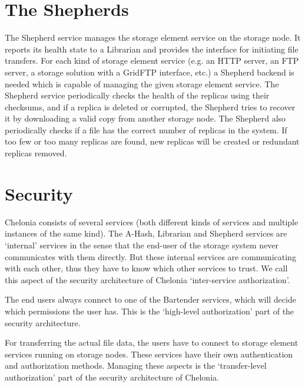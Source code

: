 \documentclass{book}
\begin{document}

\section{The Shepherds} %
\label{sec:the_shepherds}

The Shepherd service manages the storage element service on the storage node. It reports its health state to a Librarian and provides the interface for initiating file transfers. For each kind of storage element service (e.g. an HTTP server, an FTP server, a storage solution with a GridFTP interface, etc.) a Shepherd backend is needed which is capable of managing the given storage element service. The Shepherd service periodically checks the health of the replicas using their checksums, and if a replica is deleted or corrupted, the Shepherd tries to recover it by downloading a valid copy from another storage node. The Shepherd also periodically checks if a file has the correct number of replicas in the system. If too few or too many replicas are found, new replicas will be created or redundant replicas removed.


\section{Security} %
\label{sec:security}

Chelonia consists of several services (both different kinds of services and multiple instances of the same kind). The A-Hash, Librarian and Shepherd services are `internal' services in the sense that the end-user of the storage system never communicates with them directly. But these internal services are communicating with each other, thus they have to know which other services to trust. We call this aspect of the security architecture of Chelonia `inter-service authorization'.

The end users always connect to one of the Bartender services, which will decide which permissions the user has. This is the `high-level authorization' part of the security architecture.

For transferring the actual file data, the users have to connect to storage element services running on storage nodes. These services have their own authentication and authorization methods. Managing these aspects is the `transfer-level authorization' part of the security architecture of Chelonia.
\end{document}
